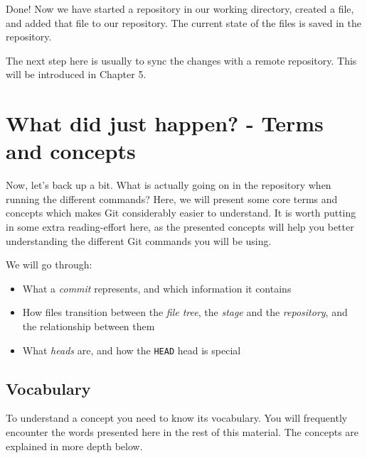 \documentclass[../main/git_course_main.tex]{subfiles}
\begin{document}
	Done! Now we have started a repository in our working directory, created a file, and added that file to our repository. The current state of the files is saved in the repository.
	
	The next step here is usually to sync the changes with a remote repository.
	This will be introduced in Chapter 5.
	
	\section{What did just happen? - Terms and concepts}
	
	Now, let's back up a bit. What is actually going on in the repository when running the different commands? Here, we will present some core terms and concepts which makes Git considerably easier to understand. It is worth putting in some extra reading-effort here, as the presented concepts will help you better understanding the different Git commands you will be using.
	
	We will go through:
	
	\begin{itemize}
		\item What a \textit{commit} represents, and which information it contains
		\item How files transition between the \textit{file tree}, the \textit{stage} and the \textit{repository}, and the relationship between them
		\item What \textit{heads} are, and how the \verb$HEAD$ head is special
	\end{itemize}
	
	\subsection{Vocabulary}
	
	To understand a concept you need to know its vocabulary. You will frequently encounter the words presented here in the rest of this material. The concepts are explained in more depth below.
	
\end{document}
